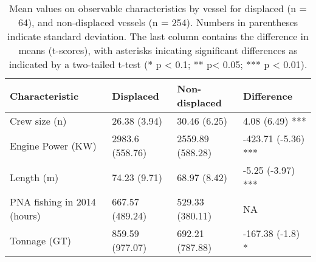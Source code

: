 \begin{table}[t]

\caption{\label{tab:}Mean values on observable characteristics by vessel for displaced (n = 64), and non-displaced vessels (n = 254). Numbers in parentheses indicate standard deviation. The last column contains the difference in means (t-scores), with asterisks inicating significant differences as indicated by a two-tailed t-test (* p < 0.1; ** p< 0.05; *** p < 0.01).}
\centering
\begin{tabular}{l|l|l|l}
\hline
Characteristic & Displaced & Non-displaced & Difference\\
\hline
Crew size (n) & 26.38 (3.94) & 30.46 (6.25) & 4.08 (6.49) ***\\
\hline
Engine Power (KW) & 2983.6 (558.76) & 2559.89 (588.28) & -423.71 (-5.36) ***\\
\hline
Length (m) & 74.23 (9.71) & 68.97 (8.42) & -5.25 (-3.97) ***\\
\hline
PNA fishing in 2014 (hours) & 667.57 (489.24) & 529.33 (380.11) & NA\\
\hline
Tonnage (GT) & 859.59 (977.07) & 692.21 (787.88) & -167.38 (-1.8) *\\
\hline
\end{tabular}
\end{table}